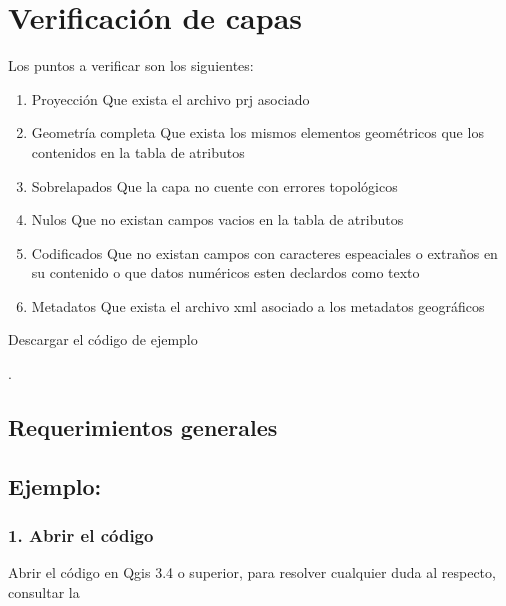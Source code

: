 \documentclass[letterpaper,10pt,spanish]{sphinxmanual}
\begin{document}
\section{Verificación de capas}
\label{\detokenize{verificacion:verificacion-de-capas}}\label{\detokenize{verificacion::doc}}
Los puntos a verificar son los siguientes:
\begin{enumerate}
\def\theenumi{\arabic{enumi}}
\def\labelenumi{\theenumi .}
\makeatletter\def\p@enumii{\p@enumi \theenumi .}\makeatother
\item {} 
Proyección Que exista el archivo prj asociado

\item {} 
Geometría completa  Que exista los mismos elementos geométricos que los contenidos en la tabla de atributos

\item {} 
Sobrelapados Que la capa no cuente con errores topológicos

\item {} 
Nulos Que no existan campos vacios en la tabla de atributos

\item {} 
Codificados Que no existan campos con caracteres espeaciales o extraños en su contenido o que datos numéricos esten declardos como texto

\item {} 
Metadatos Que exista el archivo xml asociado a los metadatos geográficos

\end{enumerate}

Descargar el código de ejemplo

.


\subsection{Requerimientos generales}
\label{\detokenize{verificacion:requerimientos-generales}}

\subsection{Ejemplo:}
\label{\detokenize{verificacion:ejemplo}}

\subsubsection{1. Abrir el código}
\label{\detokenize{verificacion:abrir-el-codigo}}
Abrir el código  en Qgis 3.4 o superior,
para resolver cualquier duda al respecto, consultar la 
\end{document}
